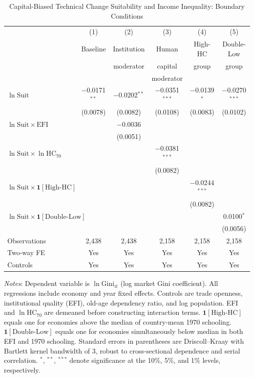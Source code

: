 \documentclass[12pt]{article}
\newcommand{\suit}{\mathrm{Suit}}
\newcommand{\gini}{\mathrm{Gini}}
\newcommand{\hc}{\mathrm{HC}}
\begin{document}
\begin{table}[H]
\centering
\begin{threeparttable}
\caption{Capital-Biased Technical Change Suitability and Income
         Inequality: Boundary Conditions}
\label{tab:main}
\small
\begin{tabular}{l*{5}{c}}
\toprule
 & (1) & (2) & (3) & (4) & (5) \\
 & Baseline & Institution & Human & High-HC & Double-Low \\
 &          & moderator   & capital & group & group \\
 &          &             & moderator & & \\
\midrule
$\ln \suit$
  & $-$0.0171$^{**}$ & $-$0.0202$^{**}$ & $-$0.0351$^{***}$
  & $-$0.0139$^{*}$  & $-$0.0270$^{***}$ \\
  & (0.0078) & (0.0082) & (0.0108) & (0.0083) & (0.0102) \\[4pt]
$\ln \suit \times \mathrm{EFI}$
  & & $-$0.0036 & & & \\
  & & (0.0051) & & & \\[4pt]
$\ln \suit \times \ln \hc_{70}$
  & & & $-$0.0381$^{***}$ & & \\
  & & & (0.0082) & & \\[4pt]
$\ln \suit \times \mathbf{1}[\text{High-HC}]$
  & & & & $-$0.0244$^{***}$ & \\
  & & & & (0.0082) & \\[4pt]
$\ln \suit \times \mathbf{1}[\text{Double-Low}]$
  & & & & & 0.0100$^{*}$ \\
  & & & & & (0.0056) \\[4pt]
\midrule
Observations
  & 2,438 & 2,438 & 2,158 & 2,158 & 2,158 \\
Two-way FE   & Yes & Yes & Yes & Yes & Yes \\
Controls     & Yes & Yes & Yes & Yes & Yes \\
\bottomrule
\end{tabular}
\begin{tablenotes}
\footnotesize
\item \textit{Notes}: Dependent variable is $\ln \gini_{it}$ (log market
Gini coefficient). All regressions include economy and year fixed effects.
Controls are trade openness, institutional quality (EFI), old-age
dependency ratio, and log population.
EFI and $\ln \hc_{70}$ are demeaned before constructing interaction terms.
$\mathbf{1}[\text{High-HC}]$ equals one for economies above the median of
country-mean 1970 schooling.
$\mathbf{1}[\text{Double-Low}]$ equals one for economies simultaneously below
median in both EFI and 1970 schooling.
Standard errors in parentheses are Driscoll--Kraay
\citep{driscoll1998consistent} with Bartlett kernel bandwidth of 3,
robust to cross-sectional dependence and serial correlation.
$^{*}$, $^{**}$, $^{***}$ denote significance at the 10\%, 5\%,
and 1\% levels, respectively.
\end{tablenotes}
\end{threeparttable}
\end{table}
\end{document}
